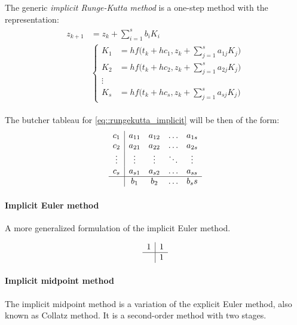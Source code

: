 The generic \textit{implicit Runge-Kutta method} is
a one-step method with the representation:
\begin{equation}
	\begin{split}
	\begin{aligned}
		z_{k+1} &= z_k + \sum_{i=1}^{s}b_iK_i \\
		&\begin{cases}
		K_1 &= hf\Big(t_k+hc_1,z_k + \displaystyle\sum_{j=1}^{s}a_{1j}K_j\Big) \\[1em]
		K_2 &= hf\Big(t_k+hc_2,z_k + \displaystyle\sum_{j=1}^{s}a_{2j}K_j\Big) \\[1em]
		\vdots \\[1em]
		K_s &= hf\Big(t_k+hc_s,z_k + \displaystyle\sum_{j=1}^{s}a_{sj}K_j\Big)
		\end{cases}
	\end{aligned}
	\end{split}
	\label{eq::rungekutta_implicit}
\end{equation}

The butcher tableau for \eqref{eq::rungekutta_implicit} will be then of the form:
\begin{equation}
	\begin{array}
	{c|cccc}
		c_1    & a_{11} & a_{12} & \ldots & a_{1s} \\
		c_2    & a_{21} & a_{22} & \ldots & a_{2s} \\
		\vdots & \vdots & \vdots & \ddots & \vdots \\
		c_s    & a_{s1} & a_{s2} & \ldots & a_{ss} \\ \hline
		       & b_1    & b_2    & \ldots & b_ss
	\end{array}
\end{equation}

\paragraph{Implicit Euler method}
A more generalized formulation of the implicit Euler method.

\begin{equation}
	\begin{array}{c|c}
		1 & 1 \\ \hline
		  & 1  
	\end{array}
	\label{eq::implicit_euler}
\end{equation}

\paragraph{Implicit midpoint method}
The implicit midpoint method is a variation of the explicit Euler method,
also known as Collatz method. It is a second-order method with two stages.

